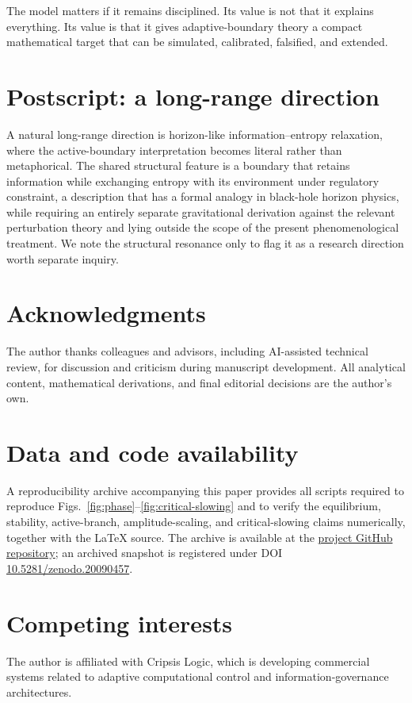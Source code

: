 \documentclass[11pt]{article}
\begin{document}
The model matters if it remains disciplined. Its value is not that it explains everything. Its value is that it gives adaptive-boundary theory a compact mathematical target that can be simulated, calibrated, falsified, and extended.

\section*{Postscript: a long-range direction}
A natural long-range direction is horizon-like information--entropy relaxation, where the active-boundary interpretation becomes literal rather than metaphorical. The shared structural feature is a boundary that retains information while exchanging entropy with its environment under regulatory constraint, a description that has a formal analogy in black-hole horizon physics, while requiring an entirely separate gravitational derivation against the relevant perturbation theory and lying outside the scope of the present phenomenological treatment. We note the structural resonance only to flag it as a research direction worth separate inquiry.

\section*{Acknowledgments}
The author thanks colleagues and advisors, including AI-assisted technical review, for discussion and criticism during manuscript development. All analytical content, mathematical derivations, and final editorial decisions are the author's own.

\section*{Data and code availability}
A reproducibility archive accompanying this paper provides all scripts required to reproduce Figs.~\ref{fig:phase}--\ref{fig:critical-slowing} and to verify the equilibrium, stability, active-branch, amplitude-scaling, and critical-slowing claims numerically, together with the LaTeX source. The archive is available at the \href{https://github.com/hellocripsis/adaptive-boundary-equation}{project GitHub repository}; an archived snapshot is registered under DOI \href{https://doi.org/10.5281/zenodo.20090457}{10.5281/zenodo.20090457}.

\section*{Competing interests}
The author is affiliated with Cripsis Logic, which is developing commercial systems related to adaptive computational control and information-governance architectures.
\end{document}

